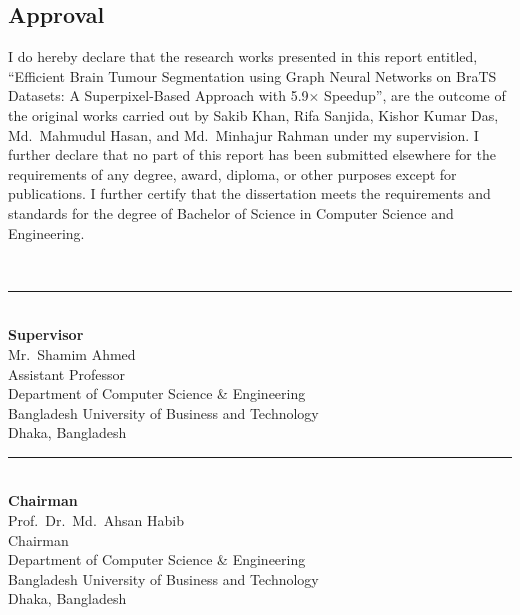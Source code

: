 \documentclass{article}
\begin{document}
\begin{center}
    \section*{Approval}
\end{center}

I do hereby declare that the research works presented in this report entitled,
``Efficient Brain Tumour Segmentation using Graph Neural Networks on BraTS Datasets:
A Superpixel-Based Approach with 5.9$\times$ Speedup'', are the outcome of the
original works carried out by Sakib Khan, Rifa Sanjida, Kishor Kumar Das,
Md.\ Mahmudul Hasan, and Md.\ Minhajur Rahman under my supervision. I further
declare that no part of this report has been submitted elsewhere for the requirements
of any degree, award, diploma, or other purposes except for publications. I further
certify that the dissertation meets the requirements and standards for the degree of
Bachelor of Science in Computer Science and Engineering.

\vspace{6mm}

\null\hfill\\
\noindent\rule{9.3cm}{0.2pt} \\
\textbf{Supervisor}\\
Mr.\ Shamim Ahmed \\
Assistant Professor \\
Department of Computer Science \& Engineering \\
Bangladesh University of Business and Technology\\
Dhaka, Bangladesh

\vspace{16mm}

\begin{flushleft}
\nopagebreak
\noindent\rule{9.3cm}{0.2pt} \\
\nopagebreak
\textbf{Chairman} \null\hfill \\
\nopagebreak
Prof.\ Dr.\ Md.\ Ahsan Habib \\
\nopagebreak
Chairman \\
\nopagebreak
Department of Computer Science \& Engineering \\
\nopagebreak
Bangladesh University of Business and Technology\\
\nopagebreak
Dhaka, Bangladesh\\
\end{flushleft}
\cleardoublepage
\end{document}
